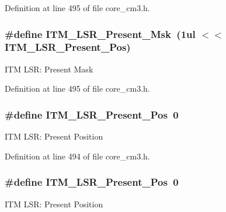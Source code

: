Definition at line 495 of file core\+\_\+cm3.\+h.

\subsubsection[{\texorpdfstring{I\+T\+M\+\_\+\+L\+S\+R\+\_\+\+Present\+\_\+\+Msk}{ITM_LSR_Present_Msk}}]{\setlength{\rightskip}{0pt plus 5cm}\#define I\+T\+M\+\_\+\+L\+S\+R\+\_\+\+Present\+\_\+\+Msk~(1ul $<$$<$ I\+T\+M\+\_\+\+L\+S\+R\+\_\+\+Present\+\_\+\+Pos)}\hypertarget{group___c_m_s_i_s___c_m3___i_t_m_gaa5bc2a7f5f1d69ff819531f5508bb017}{}\label{group___c_m_s_i_s___c_m3___i_t_m_gaa5bc2a7f5f1d69ff819531f5508bb017}
I\+TM L\+SR\+: Present Mask 

Definition at line 495 of file core\+\_\+cm3.\+h.

\subsubsection[{\texorpdfstring{I\+T\+M\+\_\+\+L\+S\+R\+\_\+\+Present\+\_\+\+Pos}{ITM_LSR_Present_Pos}}]{\setlength{\rightskip}{0pt plus 5cm}\#define I\+T\+M\+\_\+\+L\+S\+R\+\_\+\+Present\+\_\+\+Pos~0}\hypertarget{group___c_m_s_i_s___c_m3___i_t_m_gaf5740689cf14564d3f3fd91299b6c88d}{}\label{group___c_m_s_i_s___c_m3___i_t_m_gaf5740689cf14564d3f3fd91299b6c88d}
I\+TM L\+SR\+: Present Position 

Definition at line 494 of file core\+\_\+cm3.\+h.

\subsubsection[{\texorpdfstring{I\+T\+M\+\_\+\+L\+S\+R\+\_\+\+Present\+\_\+\+Pos}{ITM_LSR_Present_Pos}}]{\setlength{\rightskip}{0pt plus 5cm}\#define I\+T\+M\+\_\+\+L\+S\+R\+\_\+\+Present\+\_\+\+Pos~0}\hypertarget{group___c_m_s_i_s___c_m3___i_t_m_gaf5740689cf14564d3f3fd91299b6c88d}{}\label{group___c_m_s_i_s___c_m3___i_t_m_gaf5740689cf14564d3f3fd91299b6c88d}
I\+TM L\+SR\+: Present Position 


